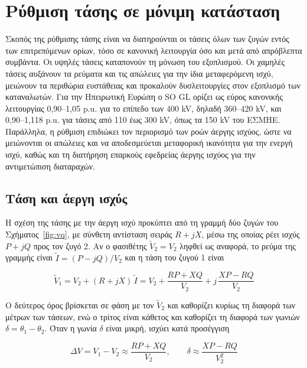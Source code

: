 \section{Ρύθμιση τάσης σε μόνιμη κατάσταση}
\label{sec:v-control}

Σκοπός της ρύθμισης τάσης είναι να διατηρούνται οι τάσεις όλων των ζυγών εντός των
επιτρεπόμενων ορίων, τόσο σε κανονική λειτουργία όσο και μετά από απρόβλεπτα συμβάντα. Οι
υψηλές τάσεις καταπονούν τη μόνωση του εξοπλισμού. Οι χαμηλές τάσεις αυξάνουν τα ρεύματα και
τις απώλειες για την ίδια μεταφερόμενη ισχύ, μειώνουν τα περιθώρια ευστάθειας και προκαλούν
δυσλειτουργίες στον εξοπλισμό των καταναλωτών. Για την Ηπειρωτική Ευρώπη ο SO GL ορίζει ως
εύρος κανονικής λειτουργίας 0,90--1,05 p.u. για το επίπεδο των 400 kV, δηλαδή 360--420 kV,
και 0,90--1,118 p.u. για τάσεις από 110 έως 300 kV, όπως τα 150 kV του ΕΣΜΗΕ. Παράλληλα, η
ρύθμιση επιδιώκει τον περιορισμό των ροών άεργης ισχύος, ώστε να μειώνονται οι απώλειες και
να αποδεσμεύεται μεταφορική ικανότητα για την ενεργή ισχύ, καθώς και τη διατήρηση επαρκούς
εφεδρείας άεργης ισχύος για την αντιμετώπιση διαταραχών.

\subsection{Τάση και άεργη ισχύς}
\label{sec:v-q}

Η σχέση της τάσης με την άεργη ισχύ προκύπτει από τη γραμμή δύο ζυγών του
Σχήματος~\ref{fig:vq}, με σύνθετη αντίσταση σειράς $R + jX$, μέσω της οποίας ρέει ισχύς
$P + jQ$ προς τον ζυγό 2. Αν ο φασιθέτης $\tilde{V}_2 = V_2$ ληφθεί ως αναφορά, το ρεύμα της
γραμμής είναι $\tilde{I} = (P - jQ)/V_2$ και η τάση του ζυγού 1 είναι

\begin{equation}
\tilde{V}_1 = V_2 + (R + jX)\,\tilde{I}
= V_2 + \frac{RP + XQ}{V_2} + j\,\frac{XP - RQ}{V_2}
\label{eq:v1phasor}
\end{equation}

Ο δεύτερος όρος βρίσκεται σε φάση με τον $\tilde{V}_2$ και καθορίζει κυρίως τη διαφορά των
μέτρων των τάσεων, ενώ ο τρίτος είναι κάθετος και καθορίζει τη διαφορά των γωνιών
$\delta = \theta_1 - \theta_2$. Όταν η γωνία $\delta$ είναι μικρή, ισχύει κατά προσέγγιση

\begin{equation}
\Delta V = V_1 - V_2 \approx \frac{RP + XQ}{V_2}, \qquad
\delta \approx \frac{XP - RQ}{V_2^2}
\label{eq:dv}
\end{equation}

